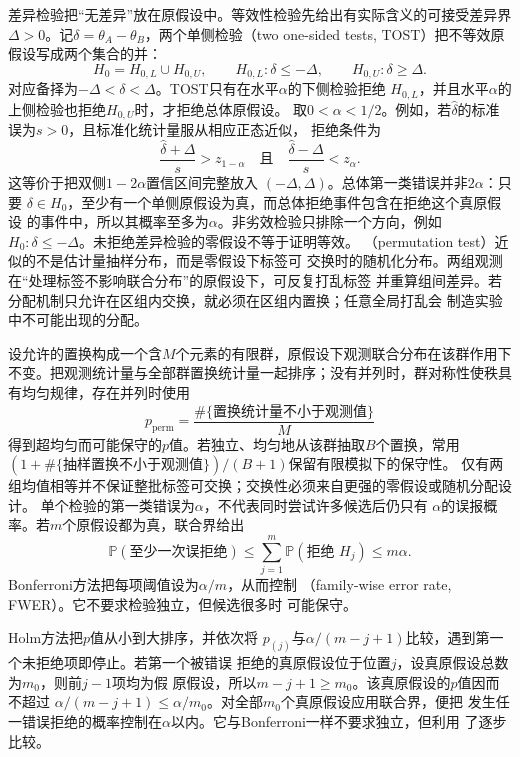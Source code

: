 差异检验把“无差异”放在原假设中。等效性检验先给出有实际含义的可接受差异界
\(\Delta>0\)。记\(\delta=\theta_A-\theta_B\)，两个单侧检验（two one-sided
tests, TOST）把不等效原假设写成两个集合的并：
\[
  H_0=H_{0,L}\cup H_{0,U},
  \qquad
  H_{0,L}:\delta\leq-\Delta,
  \qquad
  H_{0,U}:\delta\geq\Delta.
\]
对应备择为\(-\Delta<\delta<\Delta\)。TOST只有在水平\(\alpha\)的下侧检验拒绝
\(H_{0,L}\)，并且水平\(\alpha\)的上侧检验也拒绝\(H_{0,U}\)时，才拒绝总体原假设。
取\(0<\alpha<1/2\)。例如，若\(\widehat\delta\)的标准误为\(s>0\)，且标准化统计量服从相应正态近似，
拒绝条件为
\begin{equation}
  \frac{\widehat\delta+\Delta}{s}>z_{1-\alpha}
  \quad\text{且}\quad
  \frac{\widehat\delta-\Delta}{s}<z_{\alpha}.
  \label{eq:statistics-tost-rejection}
\end{equation}
这等价于把双侧\(1-2\alpha\)置信区间完整放入
\((-\Delta,\Delta)\)。总体第一类错误并非\(2\alpha\)：只要
\(\delta\in H_0\)，至少有一个单侧原假设为真，而总体拒绝事件包含在拒绝这个真原假设
的事件中，所以其概率至多为\(\alpha\)。非劣效检验只排除一个方向，例如
\(H_0:\delta\leq-\Delta\)。未拒绝差异检验的零假设不等于证明等效。
（permutation test）近似的不是估计量抽样分布，而是零假设下标签可
交换时的随机化分布。两组观测在“处理标签不影响联合分布”的原假设下，可反复打乱标签
并重算组间差异。若分配机制只允许在区组内交换，就必须在区组内置换；任意全局打乱会
制造实验中不可能出现的分配。

设允许的置换构成一个含\(M\)个元素的有限群，原假设下观测联合分布在该群作用下不变。把观测统计量与全部群置换统计量一起排序；没有并列时，群对称性使秩具有均匀规律，存在并列时使用
\[
  p_{\mathrm{perm}}
  =\frac{\#\{\text{置换统计量不小于观测值}\}}{M}
\]
得到超均匀而可能保守的\(p\)值。若独立、均匀地从该群抽取\(B\)个置换，常用
\((1+\#\{\text{抽样置换不小于观测值}\})/(B+1)\)保留有限模拟下的保守性。
仅有两组均值相等并不保证整批标签可交换；交换性必须来自更强的零假设或随机分配设计。
单个检验的第一类错误为\(\alpha\)，不代表同时尝试许多候选后仍只有
\(\alpha\)的误报概率。若\(m\)个原假设都为真，联合界给出
\[
  \mathbb{P}(\text{至少一次误拒绝})
  \leq\sum_{j=1}^m\mathbb{P}(\text{拒绝 }H_j)
  \leq m\alpha.
\]
Bonferroni方法把每项阈值设为\(\alpha/m\)，从而控制
（family-wise error rate, FWER）。它不要求检验独立，但候选很多时
可能保守。

Holm方法把\(p\)值从小到大排序，并依次将
\(p_{(j)}\)与\(\alpha/(m-j+1)\)比较，遇到第一个未拒绝项即停止。若第一个被错误
拒绝的真原假设位于位置\(j\)，设真原假设总数为\(m_0\)，则前\(j-1\)项均为假
原假设，所以\(m-j+1\geq m_0\)。该真原假设的\(p\)值因而不超过
\(\alpha/(m-j+1)\leq\alpha/m_0\)。对全部\(m_0\)个真原假设应用联合界，便把
发生任一错误拒绝的概率控制在\(\alpha\)以内。它与Bonferroni一样不要求独立，但利用
了逐步比较。

